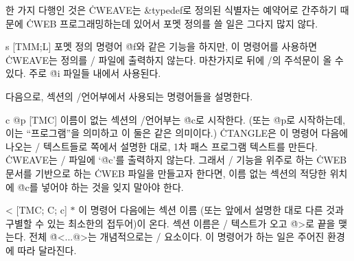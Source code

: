 \more 한 가지 다행인 것은 \.{CWEAVE}는 \&{typedef}로 정의된 식별자는
예약어로 간주하기 때문에 \.{CWEB} 프로그래밍하는데 있어서
포멧 정의를 쓸 일은 그다지 많지 않다.  

\@{s} [TM\to M;\;L] 포멧 정의 명령어 \.{@f}와 같은 기능을 하지만, 이 명령어를
사용하면 \.{CWEAVE}는 정의를 \TEX/ 파일에 출력하지 않는다. 마찬가지로 뒤에 \CEE/의
주석문이 올 수 있다. 주로 \.{@i} 파일들 내에서 사용된다.

\subsec
다음으로, 섹션의 \CEE/언어부에서 사용되는 명령어들을 설명한다.

\@{c @p} [TM\to C] 이름이 없는 섹션의 \CEE/언어부는 \.{@c}로
시작한다. (또는 \.{@p}로 시작하는데, 이는 ``프로그램''을 의미하고 이
둘은 같은 의미이다.) \.{CTANGLE}은 이 명령어 다음에 나오는 \CEE/
텍스트들로 \tangref 쪽에서 설명한 대로, 1차 패스 프로그램 텍스트를
만든다. \.{CWEAVE}는 \TEX/ 파일에 `\.{@c}'를 출력하지
않는다. 그래서 \TEX/ 기능을 위주로 하는 \.{CWEB}문서를 기반으로
하는 \.{CWEB} 파일을 만들고자 한다면, 이름 없는 섹션의 적당한
위치에 \.{@c}를 넣어야 하는 것을 잊지 말아야 한다.

\@< [TM\to C;\; C;\; c] $*$ 이 명령어 다음에는 섹션 이름 (또는 앞에서
설명한 대로 다른 것과 구별할 수 있는 최소한의 접두어)이 온다. 섹션
이름은 \TEX/ 텍스트가 오고 \.{@>}로 끝을 맺는다. 전체 \.{@<...@>}는
개념적으로는 \CEE/ 요소이다. 이 명령어가 하는 일은 주어진 환경에 따라
달라진다. 

